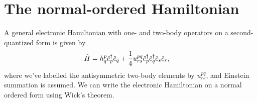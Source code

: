     \section{The normal-ordered Hamiltonian}
        A general electronic Hamiltonian with one- and two-body operators on
        a second-quantized form is given by
        \begin{align}
            \hat{H}
            &= h^{p}_{q}\hat{c}_{p}^{\dagger}\hat{c}_{q}
            + \frac{1}{4}u^{pq}_{rs}\hat{c}_{p}^{\dagger}\hat{c}_{q}^{\dagger}\hat{c}_{s}\hat{c}_{r},
        \end{align}
        where we've labelled the antisymmetric two-body elements by
        $u^{pq}_{rs}$, and Einstein summation is assumed.
        We can write the electronic Hamiltonian on a normal ordered form using
        Wick's theorem.



